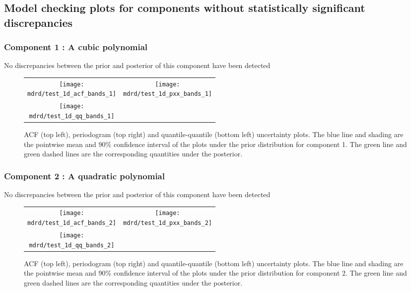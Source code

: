 \documentclass{article} %
\begin{document}
\subsection{Model checking plots for components without statistically significant discrepancies}

\subsubsection{Component 1 : A cubic polynomial}

No discrepancies between the prior and posterior of this component have been detected

\begin{figure}[H]
\newcommand{\wmgd}{0.5\columnwidth}
\newcommand{\hmgd}{3.0cm}
\newcommand{\mdrd}{test_1d}
\newcommand{\mbm}{\hspace{-0.3cm}}
\begin{tabular}{cc}
\mbm \texttt{[image: \\mdrd/test\_1d\_acf\_bands\_1]} & \texttt{[image: \\mdrd/test\_1d\_pxx\_bands\_1]} \\
\mbm \texttt{[image: \\mdrd/test\_1d\_qq\_bands\_1]}
\end{tabular}
\caption{
ACF (top left), periodogram (top right) and quantile-quantile (bottom left) uncertainty plots.
The blue line and shading are the pointwise mean and 90\% confidence interval of the plots under the prior distribution for component 1.
The green line and green dashed lines are the corresponding quantities under the posterior.}
\label{fig:check1}
\end{figure}

\subsubsection{Component 2 : A quadratic polynomial}

No discrepancies between the prior and posterior of this component have been detected

\begin{figure}[H]
\newcommand{\wmgd}{0.5\columnwidth}
\newcommand{\hmgd}{3.0cm}
\newcommand{\mdrd}{test_1d}
\newcommand{\mbm}{\hspace{-0.3cm}}
\begin{tabular}{cc}
\mbm \texttt{[image: \\mdrd/test\_1d\_acf\_bands\_2]} & \texttt{[image: \\mdrd/test\_1d\_pxx\_bands\_2]} \\
\mbm \texttt{[image: \\mdrd/test\_1d\_qq\_bands\_2]}
\end{tabular}
\caption{
ACF (top left), periodogram (top right) and quantile-quantile (bottom left) uncertainty plots.
The blue line and shading are the pointwise mean and 90\% confidence interval of the plots under the prior distribution for component 2.
The green line and green dashed lines are the corresponding quantities under the posterior.}
\label{fig:check2}
\end{figure}
\end{document}
